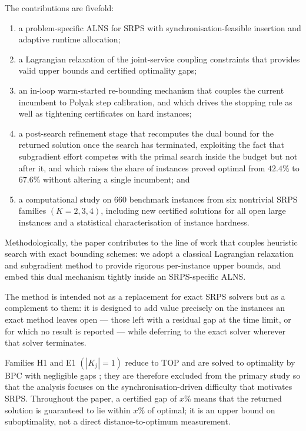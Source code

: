 \documentclass[preprint,12pt]{elsarticle}
\begin{document}
The contributions are fivefold:
\begin{enumerate}[label=(\roman*)]
    \item a problem-specific ALNS for SRPS with synchronisation-feasible insertion and adaptive runtime allocation;
    \item a Lagrangian relaxation of the joint-service coupling constraints that provides valid upper bounds and certified optimality gaps;
    \item an in-loop warm-started re-bounding mechanism that couples the current incumbent to Polyak step calibration, and which drives the stopping rule as well as tightening certificates on hard instances;
    \item a post-search refinement stage that recomputes the dual bound for the returned solution once the search has terminated, exploiting the fact that subgradient effort competes with the primal search inside the budget but not after it, and which raises the share of instances proved optimal from $42.4\%$ to $67.6\%$ without altering a single incumbent; and
    \item a computational study on 660 benchmark instances from six nontrivial SRPS families $(K=2,3,4)$, including new certified solutions for all open large instances and a statistical characterisation of instance hardness.
\end{enumerate}

Methodologically, the paper contributes to the line of work that couples heuristic
search with exact bounding schemes: we adopt a classical Lagrangian relaxation and
subgradient method to provide rigorous per-instance upper bounds, and embed this
dual mechanism tightly inside an SRPS-specific ALNS.

The method is intended not as a replacement for exact SRPS solvers but as a complement to them: it is designed to add value precisely on the instances an exact method leaves open --- those left with a residual gap at the time limit, or for which no result is reported --- while deferring to the exact solver wherever that solver terminates.

Families H1 and E1 $(|K_j|=1)$ reduce to TOP and are solved to optimality by BPC with negligible gaps \cite{RieraLedesma2021SRPS}; they are therefore excluded from the primary study so that the analysis focuses on the synchronisation-driven difficulty that motivates SRPS. Throughout the paper, a certified gap of $x$\% means that the returned solution is guaranteed to lie within $x$\% of optimal; it is an upper bound on suboptimality, not a direct distance-to-optimum measurement.
\end{document}
